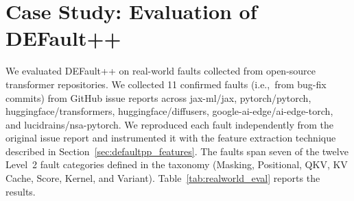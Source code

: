\section{Case Study: Evaluation of DEFault++}
\label{sec:defaultpp_casestudy}

We evaluated DEFault++ on real-world faults collected from open-source transformer repositories. We collected 11 confirmed faults (i.e.,~from bug-fix commits) from GitHub issue reports across jax-ml/jax, pytorch/pytorch, huggingface/transformers, huggingface/diffusers, google-ai-edge/ai-edge-torch, and lucidrains/nsa-pytorch. We reproduced each fault independently from the original issue report and instrumented it with the feature extraction technique described in Section~\ref{sec:defaultpp_features}. The faults span seven of the twelve Level~2 fault categories defined in the taxonomy (Masking, Positional, QKV, KV Cache, Score, Kernel, and Variant). Table~\ref{tab:realworld_eval} reports the results.

